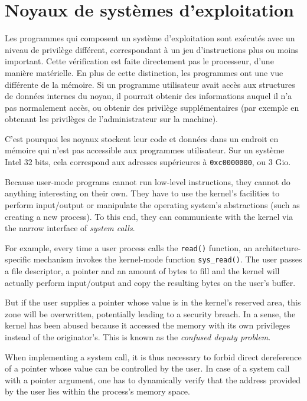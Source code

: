 \section{Noyaux de systèmes d'exploitation}

Les programmes qui composent un système d'exploitation sont exécutés avec un
niveau de privilège différent, correspondant à un jeu d'instructions plus ou
moins important. Cette vérification est faite directement pas le processeur,
d'une manière matérielle. En plus de cette distinction, les programmes ont une
vue différente de la mémoire. Si un programme utilisateur avait accès aux
structures de données internes du noyau, il pourrait obtenir des informations
auquel il n'a pas normalement accès, ou obtenir des privilège supplémentaires
(par exemple en obtenant les privilèges de l'administrateur sur la machine).

C'est pourquoi les noyaux stockent leur code et données dans un endroit en
mémoire qui n'est pas accessible aux programmes utilisateur. Sur un système
Intel 32 bits, cela correspond aux adresses supérieures à \texttt{0xc0000000},
ou 3 Gio.


Because user-mode programs cannot run low-level instructions, they cannot do
anything interesting on their own. They have to use the kernel's facilities to
perform input/output or manipulate the operating system's abstractions (such as
creating a new process). To this end, they can communicate with the kernel
via the narrow interface of \emph{system calls}.

For example, every time a user process calls the \texttt{read()} function, an
architecture-specific mechanism invokes the kernel-mode function
\texttt{sys\_read()}. The user passes a file descriptor, a pointer and an amount
of bytes to fill and the kernel will actually perform input/output and copy the
resulting bytes on the user's buffer.

But if the user supplies a pointer whose value is in the kernel's reserved area,
this zone will be overwritten, potentially leading to a security breach. In a
sense, the kernel has been abused because it accessed the memory with its own
privileges instead of the originator's. This is known as the \emph{confused
deputy problem}\cite{hardy88confused}.

When implementing a system call, it is thus necessary to forbid direct
dereference of a pointer whose value can be controlled by the user. In case of a
system call with a pointer argument, one has to dynamically verify that the
address provided by the user lies within the process's memory space.


